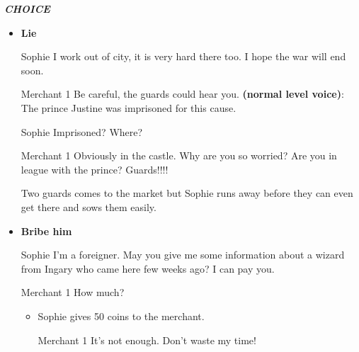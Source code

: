 \textit{\textbf{CHOICE}}
\begin{itemize}
\item \textbf{Lie}
  
\begin{screenplay}

\begin{dialogue}{Sophie}
I work out of city, it is very hard there too. I hope the war will end soon.
\end{dialogue}
  
\begin{dialogue}{Merchant 1}
Be careful, the guards could hear you. \textbf{(normal level voice)}: The prince Justine was imprisoned for this cause.
\end{dialogue}
  
\begin{dialogue}[worried]{Sophie}
Imprisoned? Where? 
\end{dialogue}

\begin{dialogue}{Merchant 1}
Obviously in the castle. Why are you so worried? Are you in league with the prince? Guards!!!!
\end{dialogue}

  Two guards comes to the market but Sophie runs away before they can even get there and sows them easily.

\end{screenplay}
  
\item \textbf{Bribe him}
  
\begin{screenplay}

\begin{dialogue}[persuasive]{Sophie}
I'm a foreigner. May you give me some information about a wizard from Ingary who came here few weeks ago? I can pay you.
\end{dialogue}
  
\begin{dialogue}{Merchant 1}
How much?
\end{dialogue}

\end{screenplay}
  
  \begin{itemize}
  \item Sophie gives 50 coins to the merchant.

\begin{screenplay}

\begin{dialogue}[annoyed]{Merchant 1}
It’s not enough. Don’t waste my time!\\
\end{dialogue}


\end{screenplay}
\end{itemize}
\end{itemize}
